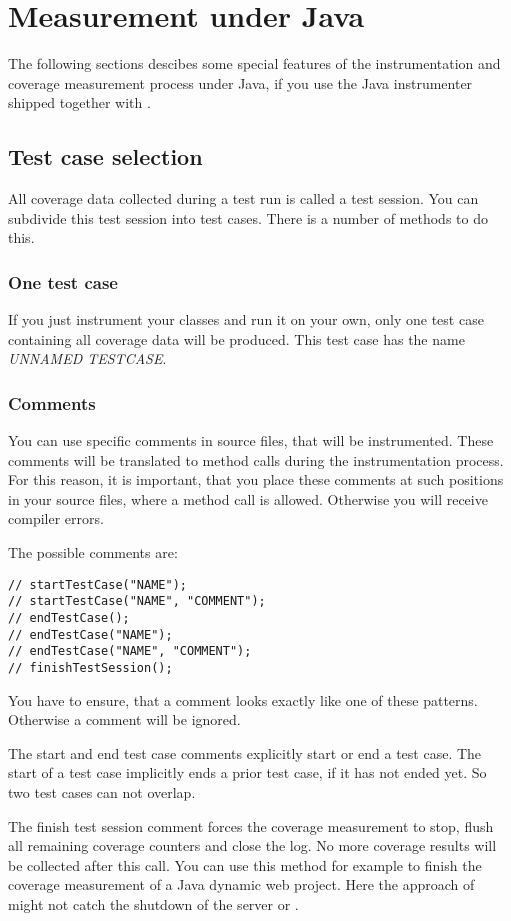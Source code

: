 \section{Measurement under Java}
The following sections descibes some special features of the instrumentation and coverage measurement process under Java, if you use the Java instrumenter shipped together with \codecover.

\subsection{Test case selection}
All coverage data collected during a test run is called a test session. You can subdivide this test session into test cases. There is a number of methods to do this.
\subsubsection{One test case}
If you just instrument your classes and run it on your own, only one test case containing all coverage data will be produced. This test case has the name \textit{UNNAMED TESTCASE}.
\subsubsection{Comments}
You can use specific comments in source files, that will be instrumented. These comments will be translated to method calls during the instrumentation process. For this reason, it is important, that you place these comments at such positions in your source files, where a method call is allowed. Otherwise you will receive compiler errors.
\par
The possible comments are:
\begin{verbatim}
// startTestCase("NAME");
// startTestCase("NAME", "COMMENT");
// endTestCase();
// endTestCase("NAME");
// endTestCase("NAME", "COMMENT");
// finishTestSession();
\end{verbatim}
You have to ensure, that a comment looks exactly like one of these patterns. Otherwise a comment will be ignored.
\par
The start and end test case comments explicitly start or end a test case. The start of a test case implicitly ends a prior test case, if it has not ended yet. So two test cases can not overlap.
\par
The finish test session comment forces the coverage measurement to stop, flush all remaining coverage counters and close the log. No more coverage results will be collected after this call. You can use this method for example to finish the coverage measurement of a Java dynamic web project. Here the  approach of \codecover might not catch the shutdown of the server or .
